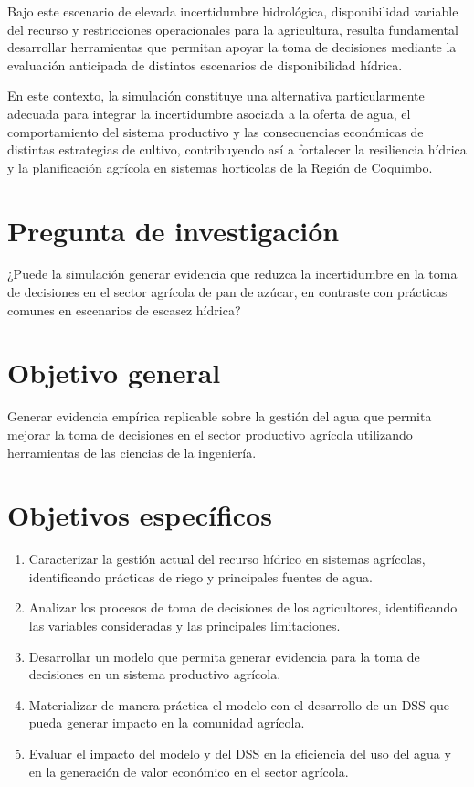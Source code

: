 \documentclass[12pt]{report}
\begin{document}
Bajo este escenario de elevada incertidumbre hidrológica, disponibilidad variable del recurso y restricciones operacionales para la agricultura, resulta fundamental desarrollar herramientas que permitan apoyar la toma de decisiones mediante la evaluación anticipada de distintos escenarios de disponibilidad hídrica. 

En este contexto, la simulación constituye una alternativa particularmente adecuada para integrar la incertidumbre asociada a la oferta de agua, el comportamiento del sistema productivo y las consecuencias económicas de distintas estrategias de cultivo, contribuyendo así a fortalecer la resiliencia hídrica y la planificación agrícola en sistemas hortícolas de la Región de Coquimbo.

\section{Pregunta de investigación}


¿Puede la simulación generar evidencia que reduzca la incertidumbre en la toma de decisiones en el sector agrícola de pan de azúcar, en contraste con prácticas comunes en escenarios de escasez hídrica?


\section{Objetivo general}
Generar evidencia empírica replicable sobre la gestión del agua que permita mejorar la toma de decisiones  en el sector productivo agrícola utilizando herramientas de las ciencias de la ingeniería.

\section{Objetivos específicos}
\begin{enumerate}
    \item Caracterizar la gestión actual del recurso hídrico en sistemas agrícolas, identificando prácticas de riego y principales fuentes de agua. 
    \item Analizar los procesos de toma de decisiones de los agricultores, identificando las variables consideradas y las principales limitaciones.
    \item Desarrollar un modelo  que permita generar evidencia para la toma de decisiones en un sistema productivo agrícola.
    \item Materializar de manera práctica el modelo con el desarrollo de un  DSS que pueda generar impacto en la comunidad agrícola.
    \item Evaluar el impacto del modelo y del DSS en la eficiencia del uso del agua y en la generación de valor económico en el sector agrícola.

\end{enumerate}  
\end{document}
